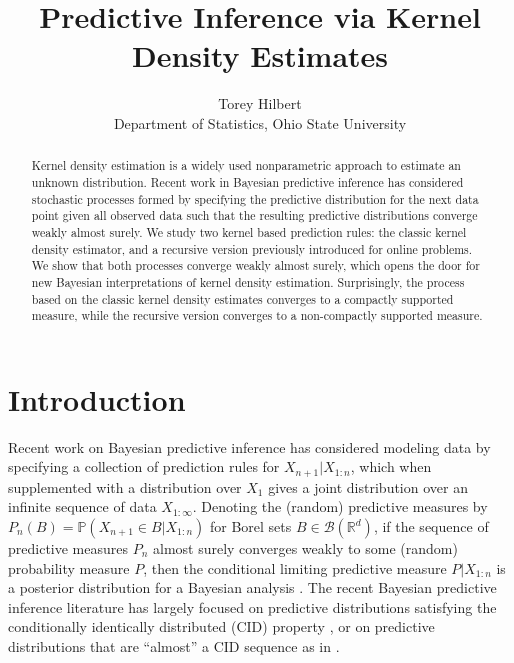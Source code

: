 \documentclass[12pt]{article}
\newcommand{\R}{\mathbb{R}}
\newcommand{\bP}{\mathbb{P}}
\begin{document}

\title{Predictive Inference via Kernel Density Estimates}

\author{Torey Hilbert
\hspace{.2cm}\\
    Department of Statistics, Ohio State University
}

\maketitle

\begin{abstract}
Kernel density estimation is a widely used nonparametric approach to estimate an unknown distribution. Recent work in Bayesian predictive inference has considered stochastic processes formed by specifying the predictive distribution for the next data point given all observed data such that the resulting predictive distributions converge weakly almost surely. We study two kernel based prediction rules: the classic kernel density estimator, and a recursive version previously introduced for online problems. We show that both processes converge weakly almost surely, which opens the door for new Bayesian interpretations of kernel density estimation. Surprisingly, the process based on the classic kernel density estimates converges to a compactly supported measure, while the recursive version converges to a non-compactly supported measure.
\end{abstract}


\section{Introduction}\label{sec-intro}

Recent work on Bayesian predictive inference has considered modeling data by specifying a collection of prediction rules for $X_{n+1} | X_{1:n}$, which when supplemented with a distribution over $X_1$ gives a joint distribution over an infinite sequence of data $X_{1:\infty}$.
Denoting the (random) predictive measures by $P_n(B) = \bP(X_{n+1} \in B | X_{1:n})$ for Borel sets $B \in \mathcal{B}(\R^d)$, if the sequence of predictive measures $P_n$ almost surely converges weakly to some (random) probability measure $P$, then the conditional limiting predictive measure $P | X_{1:n}$ is a posterior distribution for a Bayesian analysis
\citep{fortini2020quasi, fong2023martingale, fortini2025exchangeability}.
The recent Bayesian predictive inference literature has largely focused on predictive distributions satisfying the conditionally identically distributed (CID) property \citep{berti2004limit, fong2023martingale, fortini2025exchangeability}, or on predictive distributions that are ``almost'' a CID sequence as in \citet{battiston2025bayesian}.
\end{document}
